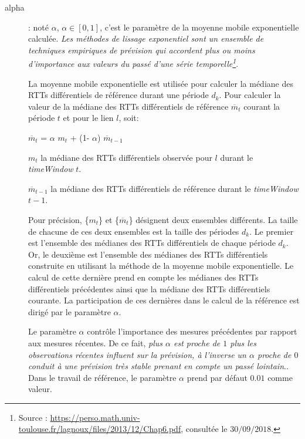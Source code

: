 \begin{description}
\item[alpha ]: noté $\alpha$,  $\alpha \in [0, 1]$, c'est le paramètre de la  moyenne mobile exponentielle calculée.
\guillemotleft \textit{ Les méthodes de lissage exponentiel  sont un ensemble de techniques empiriques de prévision qui accordent plus ou moins d'importance aux valeurs du passé d'une série temporelle\footnote{Source : \url{https://perso.math.univ-toulouse.fr/lagnoux/files/2013/12/Chap6.pdf}, consultée le $30/09/2018.$}}. \guillemotright

 La  moyenne mobile exponentielle est utilisée pour calculer la médiane des RTTs différentiels de référence durant une période $d_k$.
Pour calculer la  valeur de la médiane des RTTs différentiels de référence $ \overline{m}_{t}$   courant la période $ t $ et pour le lien $l$, soit:

\begin{center}
	$ \overline{m}_{t}$ =  $\alpha$ ${m}_{t}$ + (1-  $\alpha$) $ \overline{m}_{t-1}$
\end{center} 

$m_t$ la médiane des RTTs différentiels observée pour $l$ durant le \textit{timeWindow} $t$. 

$ \overline{m}_{t-1}$  la médiane des  RTTs différentiels  de référence durant le \textit{timeWindow} $ t-1 $.  



Pour précision, \{$m_t$\} et \{$ \overline{m}_{t}$\} désignent deux ensembles différents. La taille de chacune de ces deux ensembles est la taille des périodes $d_k$.  Le premier est l'ensemble des médianes des RTTs différentiels de chaque période $d_k$. Or, le deuxième est l'ensemble des médianes des RTTs différentiels construite en utilisant la méthode de la moyenne mobile exponentielle. Le calcul de cette dernière prend en compte les médianes des RTTs différentiels précédentes ainsi que la médiane des RTTs différentiels courante. La participation de ces dernières dans le calcul de la référence est dirigé par le paramètre $\alpha$. 



Le paramètre $\alpha$  contrôle l'importance  des mesures précédentes par rapport aux mesures récentes. De ce fait, \guillemotleft \textit{plus $\alpha$ est proche de $ 1 $ plus les observations récentes influent sur la prévision, à l'inverse un $\alpha$ proche de $0$ conduit à une prévision très stable prenant en compte un passé lointain}.\guillemotright\cite{Lissages-Exponentiels}.  Dans le travail de référence, le paramètre $\alpha$  prend par défaut $0.01$ comme valeur.



\end{description}
